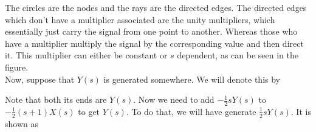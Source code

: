 \begin{center}
\end{center}
The circles are the nodes and the rays are the directed edges. The directed edges which don't have a multiplier associated are the unity multipliers, which essentially just carry the signal from one point to another. Whereas those who have a multiplier multiply the signal by the corresponding value and then direct it. This multiplier can either be constant or $s$ dependent, as can be seen in the figure.\\
Now, suppose that $Y(s)$ is generated somewhere. We will denote this by\\
\begin{center}
\end{center}
Note that both its ends are $Y(s)$. Now we need to add $-\frac{1}{2}sY(s)$ to $-\frac{1}{2}(s+1)X(s)$ to get $Y(s)$. To do that, we will have generate $\frac{1}{2}sY(s)$. It is shown as
